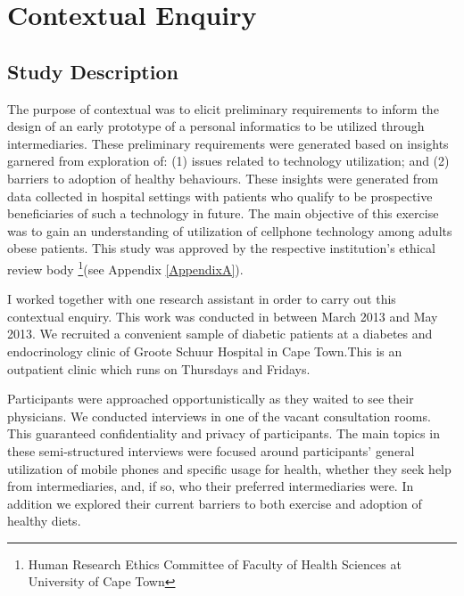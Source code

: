 
\chapter{Contextual Enquiry} %

\label{contextualenqchapter} %


\section{Study Description}
The purpose of contextual was to elicit preliminary requirements to inform the design of an early prototype of a personal informatics to be utilized through intermediaries. These preliminary requirements were generated based on insights garnered from exploration of: (1) issues related  to technology utilization; and (2) barriers to adoption of healthy behaviours. These insights were generated from data collected in hospital settings with patients who qualify to be prospective beneficiaries of such a technology in future. The main objective of this exercise was to gain an understanding of utilization of cellphone technology among adults obese patients. This study was approved by the respective institution's ethical review body \footnote{Human Research Ethics Committee of Faculty of Health Sciences at University of Cape Town}(see Appendix \ref{AppendixA}).

I worked together with one research assistant in order to carry out this contextual enquiry. This work was conducted in between March 2013 and May 2013. We recruited a convenient sample of diabetic patients at a diabetes and endocrinology clinic of Groote Schuur Hospital in Cape Town.This is an outpatient clinic which runs on Thursdays and Fridays.

Participants were approached opportunistically as they waited to see their physicians. We conducted interviews in one of the vacant consultation rooms. This guaranteed confidentiality and privacy of participants. The main topics in these semi-structured interviews were focused around participants' general utilization of mobile phones and specific usage for health, whether they seek help from intermediaries, and, if so, who their preferred intermediaries were. In addition we explored their current barriers to both exercise  and adoption of healthy diets.

